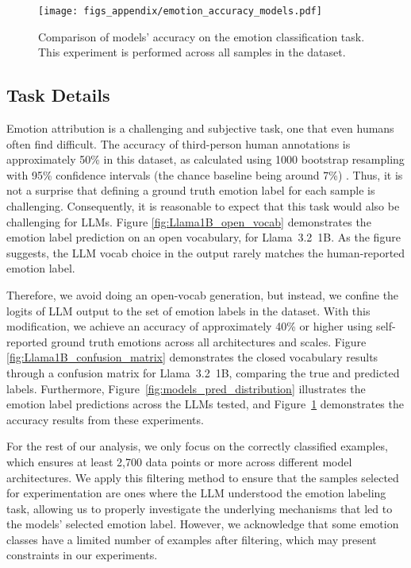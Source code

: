 \begin{figure}[t]
    \centering
    \texttt{[image: figs\_appendix/emotion\_accuracy\_models.pdf]}
  \caption{Comparison of models' accuracy on the emotion classification task. This experiment is performed across all samples in the dataset.}
  \label{fig:models_accuracy}
\end{figure} 

\subsection{Task Details} \label{app:task}

Emotion attribution is a challenging and subjective task, one that even humans often find difficult. The accuracy of third-person human annotations is approximately 50\% in this dataset, as calculated using 1000 bootstrap resampling with 95\% confidence intervals (the chance baseline being around 7\%) \cite{envent}. Thus, it is not a surprise that defining a ground truth emotion label for each sample is challenging. Consequently, it is reasonable to expect that this task would also be challenging for LLMs. Figure \ref{fig:Llama1B_open_vocab} demonstrates the emotion label prediction on an open vocabulary, for Llama~3.2~1B. As the figure suggests, the LLM vocab choice in the output rarely matches the human-reported emotion label.

Therefore, we avoid doing an open-vocab generation, but instead, we confine the logits of LLM output to the set of emotion labels in the dataset. With this modification, we achieve an accuracy of approximately 40\% or higher using self-reported ground truth emotions across all architectures and scales. Figure \ref{fig:Llama1B_confusion_matrix} demonstrates the closed vocabulary results through a confusion matrix for Llama~3.2~1B, comparing the true and predicted labels. Furthermore, Figure~\ref{fig:models_pred_distribution} illustrates the emotion label predictions across the LLMs tested, and Figure~\ref{fig:models_accuracy} demonstrates the accuracy results from these experiments.

For the rest of our analysis, we only focus on the correctly classified examples, which ensures at least 2,700 data points or more across different model architectures. We apply this filtering method to ensure that the samples selected for experimentation are ones where the LLM understood the emotion labeling task, allowing us to properly investigate the underlying mechanisms that led to the models' selected emotion label.  
However, we acknowledge that some emotion classes have a limited number of examples after filtering, which may present constraints in our experiments. 

